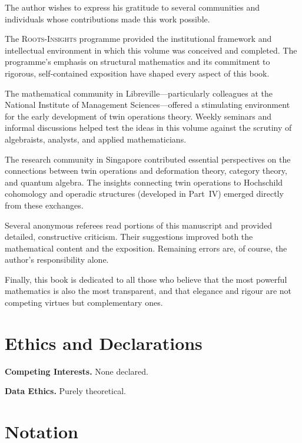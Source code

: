 \documentclass[11pt,a4paper,openany]{book}
\theoremstyle{plain}
\theoremstyle{definition}
\begin{document}
The author wishes to express his gratitude to several communities and individuals whose contributions made this work possible.

The \textsc{Roots-Insights} programme provided the institutional framework and intellectual environment in which this volume was conceived and completed. The programme's emphasis on structural mathematics and its commitment to rigorous, self-contained exposition have shaped every aspect of this book.

The mathematical community in Libreville---particularly colleagues at the National Institute of Management Sciences---offered a stimulating environment for the early development of twin operations theory. Weekly seminars and informal discussions helped test the ideas in this volume against the scrutiny of algebraists, analysts, and applied mathematicians.

The research community in Singapore contributed essential perspectives on the connections between twin operations and deformation theory, category theory, and quantum algebra. The insights connecting twin operations to Hochschild cohomology and operadic structures (developed in Part~IV) emerged directly from these exchanges.

Several anonymous referees read portions of this manuscript and provided detailed, constructive criticism. Their suggestions improved both the mathematical content and the exposition. Remaining errors are, of course, the author's responsibility alone.

Finally, this book is dedicated to all those who believe that the most powerful mathematics is also the most transparent, and that elegance and rigour are not competing virtues but complementary ones.

\cleardoublepage

\chapter*{Ethics and Declarations}

\noindent\textbf{Competing Interests.} None declared.

\medskip
\noindent\textbf{Data Ethics.} Purely theoretical.

\cleardoublepage

\chapter*{Notation}
\end{document}
